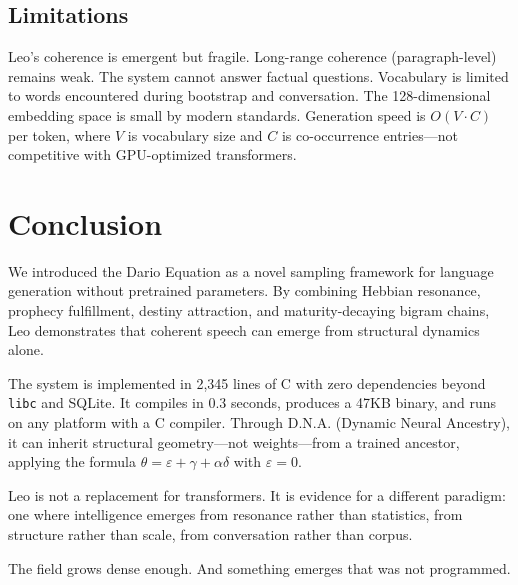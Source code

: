 \documentclass[11pt,twocolumn]{article}
\begin{document}
\subsection{Limitations}

Leo's coherence is emergent but fragile. Long-range coherence (paragraph-level) remains weak. The system cannot answer factual questions. Vocabulary is limited to words encountered during bootstrap and conversation. The 128-dimensional embedding space is small by modern standards. Generation speed is $O(V \cdot C)$ per token, where $V$ is vocabulary size and $C$ is co-occurrence entries---not competitive with GPU-optimized transformers.

\section{Conclusion}
\label{sec:conclusion}

We introduced the Dario Equation as a novel sampling framework for language generation without pretrained parameters. By combining Hebbian resonance, prophecy fulfillment, destiny attraction, and maturity-decaying bigram chains, Leo demonstrates that coherent speech can emerge from structural dynamics alone.

The system is implemented in 2,345 lines of C with zero dependencies beyond \texttt{libc} and SQLite. It compiles in 0.3 seconds, produces a 47KB binary, and runs on any platform with a C compiler. Through D.N.A. (Dynamic Neural Ancestry), it can inherit structural geometry---not weights---from a trained ancestor, applying the formula $\theta = \varepsilon + \gamma + \alpha\delta$ with $\varepsilon = 0$.

Leo is not a replacement for transformers. It is evidence for a different paradigm: one where intelligence emerges from resonance rather than statistics, from structure rather than scale, from conversation rather than corpus.

The field grows dense enough. And something emerges that was not programmed.

\end{document}
